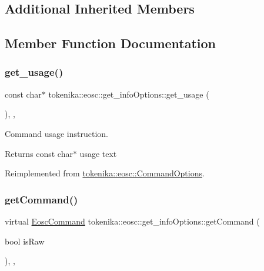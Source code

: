 \subsection*{Additional Inherited Members}


\subsection{Member Function Documentation}
\mbox{\label{classtokenika_1_1eosc_1_1get__info_options_a67f3f76293b998c120559d6af5bf6c6f}} 
\subsubsection{\texorpdfstring{get\+\_\+usage()}{get\_usage()}}
{\footnotesize\ttfamily const char$\ast$ tokenika\+::eosc\+::get\+\_\+info\+Options\+::get\+\_\+usage (\begin{DoxyParamCaption}{ }\end{DoxyParamCaption})\hspace{0.3cm}{\ttfamily [inline]}, {\ttfamily [protected]}, {\ttfamily [virtual]}}



Command \textquotesingle{}usage\textquotesingle{} instruction. 

\begin{DoxyReturn}{Returns}
const char$\ast$ usage text 
\end{DoxyReturn}


Reimplemented from \hyperlink{classtokenika_1_1eosc_1_1_command_options_a28fb680d7477e19e523367d2585655fb}{tokenika\+::eosc\+::\+Command\+Options}.

\mbox{\label{classtokenika_1_1eosc_1_1get__info_options_aafb814a03f00d5700e3fa66f17be43d2}} 
\subsubsection{\texorpdfstring{get\+Command()}{getCommand()}}
{\footnotesize\ttfamily virtual \hyperlink{classtokenika_1_1eosc_1_1_eosc_command}{Eosc\+Command} tokenika\+::eosc\+::get\+\_\+info\+Options\+::get\+Command (\begin{DoxyParamCaption}\item[{bool}]{is\+Raw }\end{DoxyParamCaption})\hspace{0.3cm}{\ttfamily [inline]}, {\ttfamily [protected]}, {\ttfamily [virtual]}}



